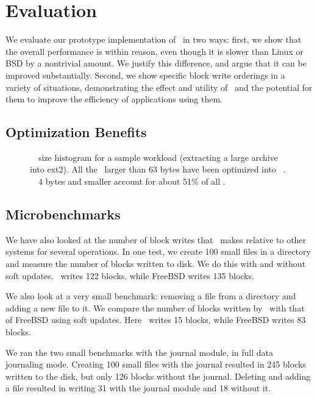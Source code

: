 \section {Evaluation}
\label{sec:evaluation}

We evaluate our prototype implementation of \Kudos\ in two ways: first, we
show that the overall performance is within reason, even though it is slower
than Linux or BSD by a nontrivial amount. We justify this difference, and argue
that it can be improved substantially. Second, we show specific block write
orderings in a variety of situations, demonstrating the effect and utility of
\opgroups\ and the potential for them to improve the efficiency of applications
using them.

\subsection {Optimization Benefits}

\begin{figure}[htb]
\vspace{-0.5\baselineskip}
\vspace{-0.5\baselineskip}
\caption{\label{fig:patchsize-histo} \Rb\ \chdesc\ size histogram for a sample
  workload (extracting a large archive into ext2). All the \chdescs\ larger than
  63 bytes have been optimized into \nrb\ \chdescs. \Rb\ \chdescs\ 4 bytes and
  smaller account for about 51\% of all \chdescs.}
\end{figure}

\subsection {Microbenchmarks}
We have also looked at the number of block writes that \Kudos\ makes
relative to other systems for several operations. In one test, we
create 100 small files in a directory and measure the number of blocks
written to disk. We do this with and without soft updates. \Kudos\
writes 122 blocks, while FreeBSD writes 135 blocks.

We also look at a very small benchmark: removing a file from a
directory and adding a new file to it. We compare the number of blocks
written by \Kudos\ with that of FreeBSD using soft updates. Here
\Kudos\ writes 15 blocks, while FreeBSD writes 83 blocks.

We ran the two small benchmarks with the journal module, in full
data journaling mode. Creating 100 small files with the journal
resulted in 245 blocks written to the disk, but only 126 blocks
without the journal. Deleting and adding a file resulted in writing
31 with the journal module and 18 without it.

